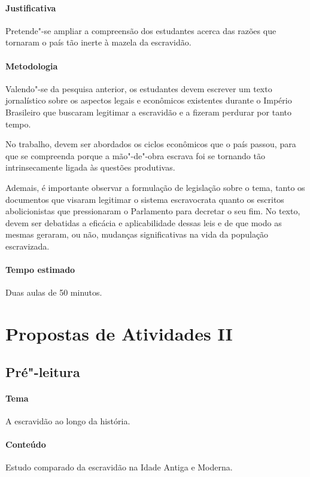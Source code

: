 \documentclass[12pt]{extarticle}
\begin{document}
\paragraph{Justificativa} Pretende"-se ampliar a compreensão dos estudantes acerca das razões que
tornaram o país tão inerte à mazela da escravidão.

\paragraph{Metodologia} Valendo"-se da pesquisa anterior, os estudantes
devem escrever um texto jornalístico sobre os aspectos legais e econômicos
existentes durante o Império Brasileiro que buscaram legitimar a escravidão
e a fizeram perdurar por tanto tempo.

No trabalho, devem ser abordados os ciclos econômicos que o país passou,
para que se compreenda porque a mão"-de"-obra escrava foi se tornando
tão intrinsecamente ligada às questões produtivas. 

Ademais, é importante observar a formulação de legislação sobre o tema, tanto
os documentos que visaram legitimar o sistema escravocrata quanto os escritos abolicionistas
que pressionaram o Parlamento para decretar o seu fim. No texto, devem ser debatidas
a eficácia e aplicabilidade dessas leis e de que modo as mesmas geraram, ou não,
mudanças significativas na vida da população escravizada.

\paragraph{Tempo estimado} Duas aulas de 50 minutos.

\section{Propostas de Atividades II}

\subsection{Pré"-leitura}

\paragraph{Tema} A escravidão ao longo da história.

\paragraph{Conteúdo} Estudo comparado da escravidão na Idade Antiga e Moderna.
\end{document}
